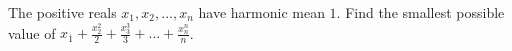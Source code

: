 The positive reals $x_1, x_2, ... , x_n$ have harmonic mean $1$. Find the smallest possible value of $x_1 + \frac{x_2 ^2}{2} + \frac{x_3 ^3}{3} + ... + \frac{x_n ^n}{n}$.